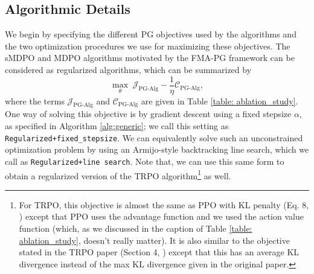 \documentclass[a4paper, 10pt]{article}
\begin{document}
\subsection{Algorithmic Details} \label{sec:tabular_algorithmic_details}
We begin by specifying the different PG objectives used by the algorithms and the two optimization procedures we use for maximizing these objectives. The sMDPO and MDPO algorithms motivated by the FMA-PG framework can be considered as regularized algorithms, which can be summarized by
\begin{equation}
  \max_\theta \; \mathcal{J}_{\text{PG-Alg}} - \frac{1}{\eta} \mathcal{C}_{\text{PG-Alg}}, \label{eq:regularized_program}
\end{equation}
where the terms $\mathcal{J}_{\text{PG-Alg}}$ and $\mathcal{C}_{\text{PG-Alg}}$ are given in Table \ref{table: ablation_study}. One way of solving this objective is by gradient descent using a fixed stepsize $\alpha$, as specified in Algorithm \ref{alg:generic}; we call this setting as \texttt{Regularized+fixed_stepsize}. We can equivalently solve such an unconstrained optimization problem by using an Armijo-style backtracking line search, which we call as \texttt{Regularized+line search}. Note that, we can use this same form to obtain a regularized version of the TRPO algorithm\footnote{For TRPO, this objective is almost the same as PPO with KL penalty (Eq. 8, \citet{schulman2017proximal}) except that PPO uses the advantage function and we used the action value function (which, as we discussed in the caption of Table \ref{table: ablation_study}, doesn't really matter). It is also similar to the objective stated in the TRPO paper (Section 4, \citet{schulman2015trust}) except that this has an average KL divergence instead of the max KL divergence given in the original paper.} as well.
\end{document}
